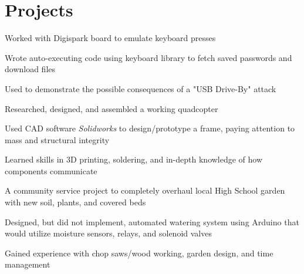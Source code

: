 \documentclass[12pt,letterpaper]{deedy-resume} %
\begin{document}
\hfill %
%
%
\begin{minipage}[t]{0.5\textwidth} %

\section{Projects}

\vspace{\topsep} %
\begin{tightitemize}
\item Worked with Digispark board to emulate keyboard presses
\item Wrote auto-executing code using keyboard library to fetch saved passwords and download files
\item Used to demonstrate the possible consequences of a "USB Drive-By" attack
\end{tightitemize}


\sectionspace %


\begin{tightitemize}
\item Researched, designed, and assembled a working quadcopter
\item Used CAD software \textit{Solidworks} to design/prototype a frame, paying attention to mass and structural integrity %
\item Learned skills in 3D printing, soldering, and in-depth knowledge of how components communicate
\end{tightitemize}


\sectionspace %


\begin{tightitemize}
\item A community service project to completely overhaul local High School garden with new soil, plants, and covered beds
\item Designed, but did not implement, automated watering system using Arduino that would utilize moisture sensors, relays, and solenoid valves
\item Gained experience with chop saws/wood working, garden design, and time management
\end{tightitemize}


\end{minipage}
\end{document}
